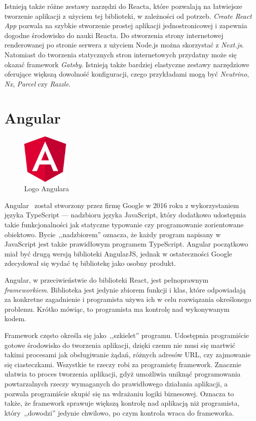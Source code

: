 \documentclass[twoside,a4paper]{report}
\begin{document}
Istnieją także różne zestawy narzędzi do Reacta, które pozwalają na łatwiejsze tworzenie aplikacji z użyciem tej biblioteki, w zależności od potrzeb.
\textit{Create React App} pozwala na szybkie stworzenie prostej aplikacji jednostronicowej i zapewnia dogodne środowisko do nauki Reacta.
Do stworzenia strony internetowej renderowanej po stronie serwera z użyciem Node.js można skorzystać z \textit{Next.js}.
Natomiast do tworzenia statycznych stron internetowych przydatny może się okazać framework \textit{Gatsby}.
Istnieją także bardziej elastyczne zestawy narzędziowe oferujące większą dowolność konfiguracji, czego przykładami mogą być \textit{Neutrino}, \textit{Nx}, \textit{Parcel} czy \textit{Razzle}.

\section{Angular}
\begin{figure}
    \centering
    \includegraphics[width=0.2\textwidth]{img/logo_angular.png}
    \caption*{Logo Angulara}\label{fig:logo_angular}
\end{figure}
Angular~\cite{angulardocs} został stworzony przez firmę Google w 2016 roku z wykorzystaniem języka TypeScript --- nadzbioru języka JavaScript, który dodatkowo udostępnia takie funkcjonalności jak statyczne typowanie czy programowanie zorientowane obiektowo.
Bycie~,,nadzbiorem'' oznacza, że każdy program napisany w JavaScript jest także prawidłowym programem TypeScript.
Angular początkowo miał być drugą wersją biblioteki AngularJS, jednak w ostateczności Google zdecydował się wydać tę bibliotekę jako osobny produkt.

Angular, w przeciwieństwie do biblioteki React, jest pełnoprawnym \textit{frameworkiem}.
Biblioteka jest jedynie zbiorem funkcji i klas, które odpowiadają za konkretne zagadnienie i programista używa ich w celu rozwiązania określonego problemu.
Krótko mówiąc, to programista ma kontrolę nad wykonywanym kodem.

Framework często określa się jako~,,szkielet'' programu.
Udostępnia programiście gotowe środowisko do tworzenia aplikacji, dzięki czemu nie musi się martwić takimi procesami jak obsługiwanie żądań, różnych adresów URL, czy zajmowanie się ciasteczkami.
Wszystkie te rzeczy robi za programistę framework.
Znacznie ułatwia to proces tworzenia aplikacji, gdyż umożliwia uniknąć programowania powtarzalnych rzeczy wymaganych do prawidłowego działania aplikacji, a pozwala programiście skupić się na wdrażaniu logiki biznesowej.
Oznacza to także, że framework sprawuje większą kontrolę nad aplikacją niż programista, który~,,dowodzi'' jedynie chwilowo, po czym kontrola wraca do frameworka.
\end{document}
